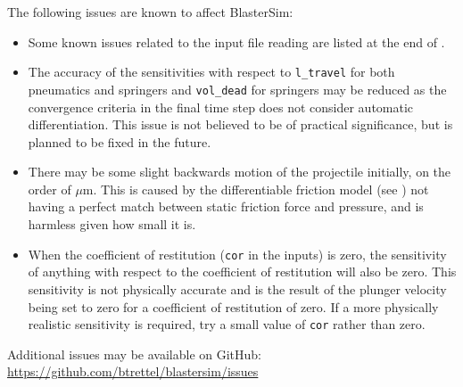 The following issues are known to affect BlasterSim:
\begin{itemize}
\item Some known issues related to the input file reading are listed at the end of .
\item The accuracy of the sensitivities with respect to \texttt{l\_travel} for both pneumatics and springers and \texttt{vol\_dead} for springers may be reduced as the convergence criteria in the final time step does not consider automatic differentiation.
This issue is not believed to be of practical significance, but is planned to be fixed in the future.
\item There may be some slight backwards motion of the projectile initially, on the order of $\mu$m.
This is caused by the differentiable friction model (see ) not having a perfect match between static friction force and pressure, and is harmless given how small it is.
\item When the coefficient of restitution (\texttt{cor} in the inputs) is zero, the sensitivity of anything with respect to the coefficient of restitution will also be zero.
This sensitivity is not physically accurate and is the result of the plunger velocity being set to zero for a coefficient of restitution of zero.
If a more physically realistic sensitivity is required, try a small value of \texttt{cor} rather than zero.
\end{itemize}

Additional issues may be available on GitHub: \url{https://github.com/btrettel/blastersim/issues}
